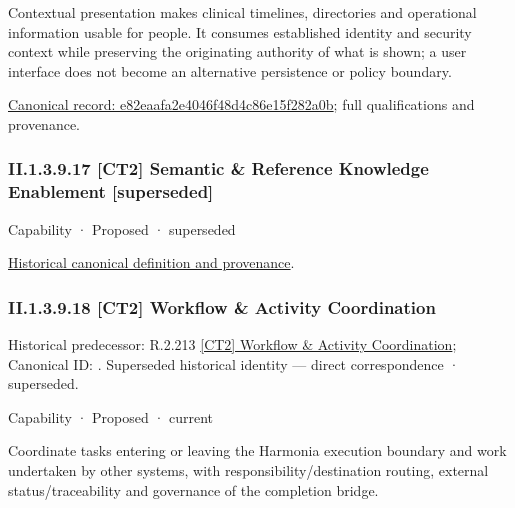 Contextual presentation makes clinical timelines, directories and operational information usable for people. It consumes established identity and security context while preserving the originating authority of what is shown; a user interface does not become an alternative persistence or policy boundary.


{\footnotesize \href{../../../../../../../continuum/strategy/capability/feature/e82eaafa2e4046f48d4c86e15f282a0b.md}{Canonical record: e82eaafa2e4046f48d4c86e15f282a0b}; full qualifications and provenance.}\par
\subsubsection*{II.1.3.9.17 [CT2] Semantic \& Reference Knowledge Enablement [superseded]}
\label{navigation:II.1.3.9.17}

\label{element:92a71292710c41b29775d19b98c197d6}
{\small Capability · Proposed · superseded}\par
\href{../../../../../../../continuum/strategy/capability/92a71292710c41b29775d19b98c197d6.md}{Historical canonical definition and provenance}.\par
\subsubsection*{II.1.3.9.18 [CT2] Workflow \& Activity Coordination}
\label{navigation:II.1.3.9.18}

{\small Historical predecessor: R.2.213 \hyperref[element:4422d865978c4353ad575759c6026d27]{[CT2] Workflow \& Activity Coordination}; Canonical ID: \texttt{}. Superseded historical identity — direct correspondence · superseded.}\par
\label{element:c724f3d38bfa4567983a11ad22095d61}
{\small Capability · Proposed · current}\par

Coordinate tasks entering or leaving the Harmonia execution boundary and work undertaken by other systems, with responsibility/destination routing, external status/traceability and governance of the completion bridge.



